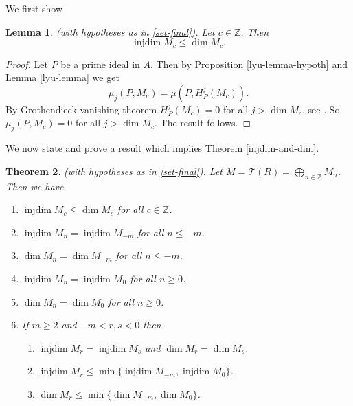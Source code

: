 \documentclass{amsart}
\newcommand{\ZZ}{\mathbb{Z} }
\newcommand{\FF}{\mathcal{T}}
\newcommand{\injdim}{\operatorname{injdim}}
\theoremstyle{plain}
\newtheorem{theorem}{Theorem}[section]
\newtheorem{lemma}[theorem]{Lemma}
\theoremstyle{definition}
\theoremstyle{remark}
\begin{document}
We first show
\begin{lemma}\label{injdim-dim}
(with hypotheses as in \ref{set-final}). Let $c \in \ZZ$. Then
\[
\injdim M_c \leq \dim M_c.
\]
\end{lemma}
\begin{proof}
Let $P$ be a prime ideal in $A$. Then by Proposition \ref{lyu-lemma-hypoth} and Lemma \ref{lyu-lemma} we get
\[
\mu_j(P, M_c) = \mu(P, H^j_P(M_c)).
\]
By Grothendieck vanishing theorem $H^j_P(M_c) = 0$ for all $j > \dim M_c$, see \cite[6.1.2]{BS}.  So $\mu_j(P, M_c) = 0$ for all $j > \dim M_c$. The result follows.
\end{proof}
We now state and prove a result which implies Theorem \ref{injdim-and-dim}.
\begin{theorem}\label{injdim-and-dim-gen}(with hypotheses as in \ref{set-final}). Let $M = \FF(R) = \bigoplus_{n \in \ZZ}M_n$. Then we have
\begin{enumerate}[\rm (1)]
\item
$\injdim M_c \leq \dim M_c$ for all $c \in \ZZ$.
\item
$\injdim M_n = \injdim M_{-m}$ for all $n \leq -m$.
\item
$\dim M_n = \dim M_{-m}$ for all $n \leq -m$.
\item
$\injdim M_n = \injdim M_{0}$ for all $n \geq 0$.
\item
$\dim M_n = \dim M_{0}$ for all $n \geq 0$.
 \item
 If $m \geq 2$ and $-m < r,s < 0$ then
 \begin{enumerate}[\rm (a)]
 \item
 $\injdim M_r = \injdim M_{s}$  and $\dim M_r = \dim M_{s}$.
 \item
 $\injdim M_r \leq \min \{ \injdim M_{-m}, \injdim M_{0} \}$.
 \item
 $\dim M_r \leq \min \{ \dim M_{-m}, \dim M_{0} \}$.
 \end{enumerate}
\end{enumerate}
\end{theorem}
\end{document}
